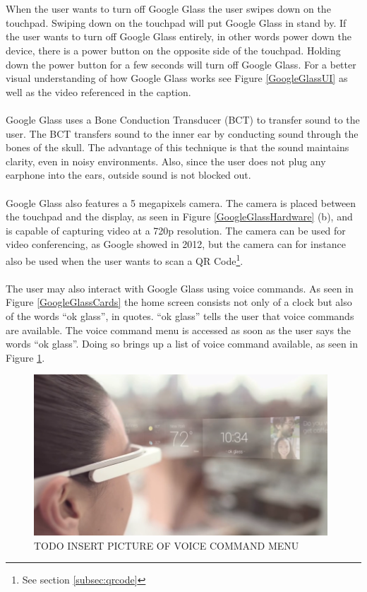 \\
\\
When the user wants to turn off Google Glass the user swipes down on the touchpad. Swiping down on the touchpad will put Google Glass in stand by. If the user wants to turn off Google Glass entirely, in other words power down the device, there is a power button on the opposite side of the touchpad. Holding down the power button for a few seconds will turn off Google Glass. For a better visual understanding of how Google Glass works see Figure \ref{GoogleGlassUI} as well as the video referenced in the caption.
\\
\\
Google Glass uses a Bone Conduction Transducer (BCT) to transfer sound to the user.\cite{GlassSpecs} The BCT transfers sound to the inner ear by conducting sound through the bones of the skull.\cite{boneConductionWiki} The advantage of this technique is that the sound maintains clarity, even in noisy environments. Also, since the user does not plug any earphone into the ears, outside sound is not blocked out.
\\
\\
Google Glass also features a 5 megapixels camera. The camera is placed between the touchpad and the display, as seen in Figure \ref{GoogleGlassHardware} (b), and is capable of capturing video at a 720p resolution. The camera can be used for video conferencing, as Google showed in 2012\cite{glassLiveDemo}, but the camera can for instance also be used when the user wants to scan a QR Code\footnote{See section \ref{subsec:qrcode}}.
\\
\\
The user may also interact with Google Glass using voice commands. As seen in Figure \ref{GoogleGlassCards} the home screen consists not only of a clock but also of the words ``ok glass'', in quotes. ``ok glass'' tells the user that voice commands are available. The voice command menu is accessed as soon as the user says the words ``ok glass''. Doing so brings up a list of voice command available, as seen in Figure \ref{voiceCommandMenu}.
\\
	\begin{figure}[ht!]
		\centering
		\includegraphics[width=110mm]{images/GoogleGlassUI}
		\caption{TODO INSERT PICTURE OF VOICE COMMAND MENU}
		\label{voiceCommandMenu}
	\end{figure}
